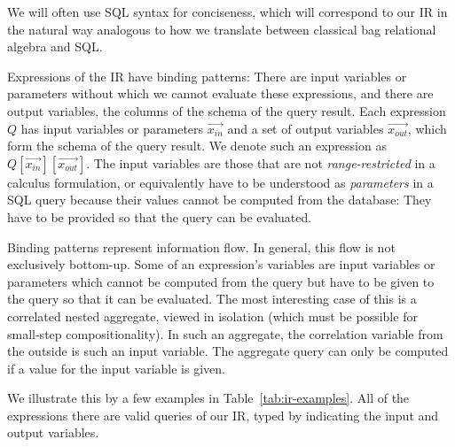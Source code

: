We will often use SQL syntax for conciseness, which will correspond to our IR in the natural way analogous to how we translate
between classical bag relational algebra and SQL.

Expressions of the IR have binding patterns: There are input variables or parameters
without which we cannot evaluate these expressions, and there are output variables, the columns of the schema of the query result.
%
Each expression $Q$ has input variables or parameters $\vec{x_{in}}$ and a set of output variables $\vec{x_{out}}$, which form the schema of the query result. We denote such an expression as $Q[\vec{x_{in}}][\vec{x_{out}}]$. The input variables are those that are not {\em range-restricted} in a calculus formulation, or equivalently have to be understood as {\em parameters} in a SQL query because their values cannot be computed from the database: They have to be provided so that the query can be evaluated.

Binding patterns represent information flow. In general, this flow is not exclusively bottom-up.
Some of an expression's variables are input variables or parameters which cannot be computed from the query but have to be given to the query so that it can be evaluated. The most interesting case of this is a correlated nested aggregate, viewed in isolation (which must be possible for small-step compositionality). In such an aggregate, the correlation variable from the outside is such an input variable. The aggregate query can only be computed if a value for the input variable is given.


We illustrate this by a few examples in Table~\ref{tab:ir-examples}.
All of the expressions there are valid queries of our IR, typed by indicating the input and output variables.

